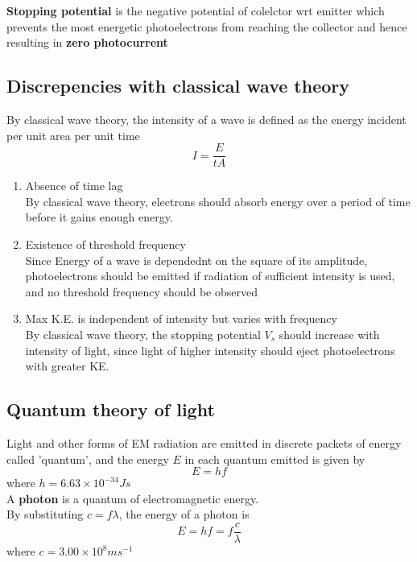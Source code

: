 \documentclass[a4paper, 10pt]{article}
\begin{document}
\begin{framed}
   \textbf{Stopping potential} is the negative potential of colelctor wrt emitter which prevents the most energetic photoelectrons from reaching the collector and hence resulting in \textbf{zero photocurrent}
\end{framed}	

\subsection{Discrepencies with classical wave theory}

      By classical wave theory, the intensity of a wave is defined as the energy incident per unit area per unit time
      \[
      I = \frac{E}{tA}
      \]
\begin{enumerate}
   \item Absence of time lag \\

      By classical wave theory, electrons should absorb energy over a period of time before it gains enough energy. 

   \item Existence of threshold frequency \\

      Since Energy of a wave is dependednt on the square of its amplitude, photoelectrons should be emitted if radiation of sufficient intensity is used, and no threshold frequency should be observed
   \item Max K.E. is independent of intensity but varies with frequency\\

      By classical wave theory, the stopping potential $V_s$ should increase with intensity of light, since light of higher intensity should eject photoelectrons with greater KE.
\end{enumerate}	

\subsection{Quantum theory of light}

\begin{framed}
   Light and other forms of EM radiation are emitted in discrete packets of energy called 'quantum', and the energy $E$ in each quantum emitted is given by
   \[
   E = hf
   \]
   where $h = 6.63 \times 10^{-34}Js $ \\
  
   A \textbf{photon} is a quantum of electromagnetic energy.  \\

   By substituting $c = f\lambda$, the energy of a photon is
   \[
    E = hf = f \frac{c}{\lambda}
   \]
   where $c = 3.00 \times 10^8 ms^{-1}$ 
\end{framed}	
\end{document}
